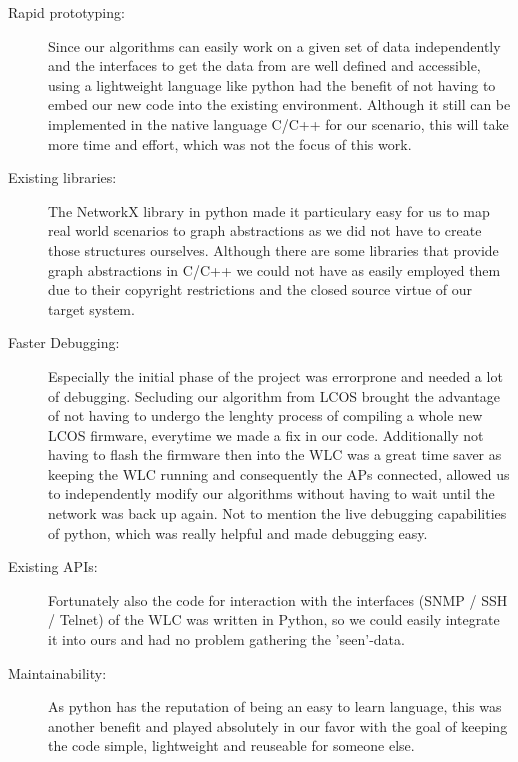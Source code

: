     \begin{description}
      \item [Rapid prototyping:]
	Since our algorithms can easily work on a given set of data independently and the interfaces to get the data from are well defined and accessible,
	using a lightweight language like python had the benefit of not having to embed our new code into the existing environment. 
	Although it still can be implemented in the native language C/C++ for our scenario, this will take more time and effort, which was not the focus of this work.
      \item[Existing libraries:]
	The NetworkX library in python made it particulary easy for us to map real world scenarios to graph abstractions as we did not have to create those structures ourselves.
	Although there are some libraries that provide graph abstractions in C/C++ we could not have as easily employed them due to their copyright restrictions and 
	the closed source virtue of our target system.
      \item[Faster Debugging:]
	Especially the initial phase of the project was errorprone and needed a lot of debugging. Secluding our algorithm from \ac{LCOS}
	brought the advantage of not having to undergo the lenghty process of compiling a whole new LCOS firmware, everytime we made a fix in our code.
	Additionally not having to flash the firmware then into the \ac{WLC} was a great time saver as keeping the \ac{WLC} running and 
	consequently the APs connected, allowed us to independently modify our algorithms without having to wait until the network was back up again. 
	Not to mention the live debugging capabilities of python, which was really helpful and made debugging easy.
      \item[Existing APIs:]
	Fortunately also the code for interaction with the interfaces (\ac{SNMP} / \ac{SSH} / Telnet) of the \ac{WLC} was written in Python, so we could easily 
	integrate it into ours and had no problem gathering the 'seen'-data.
      \item[Maintainability:]
	As python has the reputation of being an easy to learn language, this was another benefit and played absolutely in our favor with the goal of
	keeping the code simple, lightweight and reuseable for someone else.
    \end{description}
    
    \newpage
    
